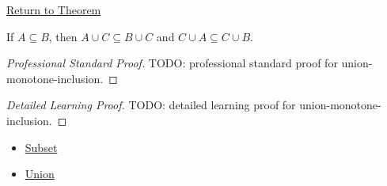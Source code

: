 \newpage
{}
\label{prf:union-monotone-inclusion}

\begin{remark*}[Return]
\hyperref[thm:union-monotone-inclusion]{Return to Theorem}
\end{remark*}

\begin{theorem*}
If $A\subseteq B$, then $A\cup C\subseteq B\cup C$ and
$C\cup A\subseteq C\cup B$.
\end{theorem*}

\begin{proof}[Professional Standard Proof]
\LRAProofBodyStart
TODO: professional standard proof for union-monotone-inclusion.
\end{proof}

\begin{proof}[Detailed Learning Proof]
\LRAProofBodyStart
TODO: detailed learning proof for union-monotone-inclusion.
\end{proof}

\begin{remark*}
\end{remark*}

\begin{dependencies}
\begin{itemize}
  \item \hyperref[def:subset]{Subset}
  \item \hyperref[def:union]{Union}
\end{itemize}
\end{dependencies}

\clearpage
